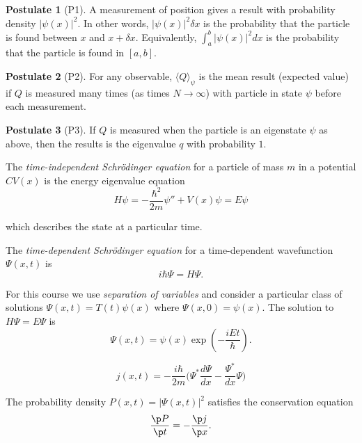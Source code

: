 \documentclass[a4paper]{article}
\theoremstyle{definition}
\newtheorem*{postulate}{Postulate}
\begin{document}
\begin{postulate}[P1]
  \label{postulate:1}
  A measurement of position gives a result with probability density $|\psi(x)|^2$. In other words, $|\psi(x)|^2 \delta x$ is the probability that the particle is found between $x$ and $x+\delta x$. Equivalently, $\int_a^b |\psi(x)|^2 dx$ is the probability that the particle is found in $[a,b]$.
\end{postulate}

\begin{postulate}[P2]
  \label{postulate:2}
  For any observable, $\langle Q\rangle_\psi$ is the mean result (expected value) if $Q$ is measured many times (as times $N\to\infty$) with particle in state $\psi$ before each measurement.
\end{postulate}

\begin{postulate}[P3]
  If \(Q\) is measured when the particle is an eigenstate \(\psi\) as above, then the results is the eigenvalue \(q\) with probability $1$.
\end{postulate}

\begin{defi}
The \emph{time-independent Schr\"odinger equation} for a particle of mass \(m\) in a potential \(CV(x)\) is the energy eigenvalue equation
\[
H\psi = -\frac{\hbar^2}{2m} \psi'' + V(x)\psi = E \psi
\]
\end{defi}
which describes the state at a particular time.

\begin{defi}
  The \emph{time-dependent Schr\"odinger equation} for a time-dependent wavefunction \(\Psi(x,t)\) is
  \[
    i\hbar \Psi = H\Psi.
  \]
\end{defi}

For this course we use \emph{separation of variables} and consider a particular class of solutions \(\Psi(x,t) = T(t)\psi(x)\) where \(\Psi(x,0) = \psi(x)\). The solution to \(H\Psi = E\Psi\) is 
\[
  \Psi(x,t) = \psi(x) \exp(-\frac{iEt}{\hbar}).
\]

\begin{defi}
  \[
    j(x,t) = -\frac{i\hbar}{2m}\Big( \Psi^* \frac{d\Psi}{dx} - \frac{\Psi^*}{dx}\Psi \Big)
  \]
\end{defi}

\begin{prop}
  The probability density \(P(x,t) = |\Psi(x,t)|^2\) satisfies the conservation equation
  \[
    \frac{\p P}{\p t} = - \frac{\p j}{\p x}.
  \]
\end{prop}
\end{document}
